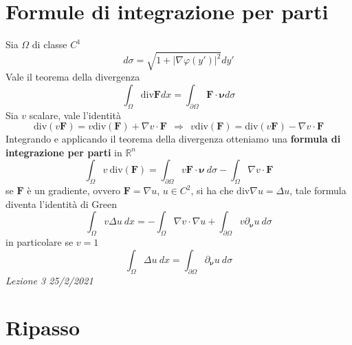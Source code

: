 \documentclass[10pt,a4paper,twoside,openright]{book}
\begin{document}
\section{Formule di integrazione per parti}

Sia $\Omega $ di classe $C^{1}$
\begin{equation*}
d\sigma =\sqrt{1+| \nabla \varphi (y')| ^{2}} dy'
\end{equation*}
Vale il teorema della divergenza
\begin{equation*}
\int _{\Omega }\mathrm{div}\mathbf{F} dx=\int _{\partial \Omega }\mathbf{F} \cdotp \bm{\nu} d\sigma 
\end{equation*}
Sia $v$ scalare, vale l'identità
\begin{equation*}
\mathrm{div}(v\mathbf{F}) =v\mathrm{div}(\mathbf{F}) +\nabla v\cdotp \mathbf{F} \ \ \Rightarrow \ \ v\mathrm{div}(\mathbf{F}) =\mathrm{div}(v\mathbf{F}) -\nabla v\cdotp \mathbf{F}
\end{equation*}
Integrando e applicando il teorema della divergenza otteniamo una \textbf{formula di integrazione per parti} in $\mathbb{R}^{n}$
\begin{equation*}
\boxed{\int _{\Omega } v\ \mathrm{div}(\mathbf{F}) =\int _{\partial \Omega } v\mathbf{F} \cdotp \bm{\nu} \ d\sigma -\int _{\Omega } \nabla v\cdotp \mathbf{F}}
\end{equation*}
se $\mathbf{F}$ è un gradiente, ovvero $\mathbf{F} =\nabla u$, $u\in C^{2}$, si ha che $\mathrm{div} \nabla u=\Delta u$, tale formula diventa l'identità di Green
\begin{equation}
\boxed{\int _{\Omega } v\Delta u\ dx=-\int _{\Omega } \nabla v\cdotp \nabla u+\int _{\partial \Omega } v\partial _{\bm{\nu}} u\ d\sigma }
\label{eq:id-green}
\end{equation}
in particolare se $v=1$
\begin{equation}
\int _{\Omega } \Delta u\ dx=\int _{\partial \Omega } \partial _{\bm{\nu}} u\ d\sigma 
\label{eq:id-green-v1}
\end{equation}
\textit{Lezione 3 25/2/2021}
\section{Ripasso}
\end{document}
